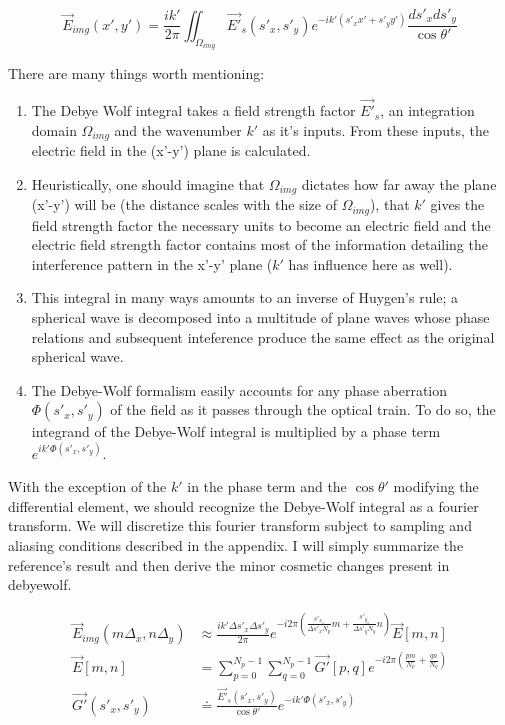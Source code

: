   \begin{equation*}
    \vec{E}_{img}(x', y') = \frac{i k'}{2 \pi} \iint_{\Omega_{img}} \vec{E'}_s(s'_x, s'_y) e^{-ik'(s'_xx'+s'_yy')}\frac{ds'_xds'_y}{\cos{\theta'}}
  \end{equation*}

  There are many things worth mentioning:
  \begin{enumerate}
  \item The Debye Wolf integral takes a field strength factor $\vec{E'}_s$,
    an integration domain $\Omega_{img}$ and the wavenumber $k'$ as it's inputs.
    From these inputs, the electric field in the (x'-y') plane is
    calculated. 
  \item Heuristically, one should imagine that $\Omega_{img}$ dictates how far 
    away the plane (x'-y') will be (the distance scales with the size of 
    $\Omega_{img}$), that $k'$ gives the field strength factor the necessary 
    units to become an electric field and the electric field strength factor 
    contains most of the information detailing the interference pattern in the
    x'-y' plane ($k'$ has influence here as well).
  \item This integral in many ways amounts to
  an inverse of Huygen's rule; a spherical wave is decomposed into a multitude 
  of plane waves whose phase relations and subsequent inteference produce
  the same effect as the original spherical wave.
  \item The Debye-Wolf formalism easily accounts for any phase aberration 
    $\Phi(s'_x,s'_y)$ of the field as it passes through the optical train. To do so, the integrand
    of the Debye-Wolf integral is multiplied by a phase term $e^{ik'\Phi(s'_x,s'_y)}$.
  \end{enumerate}

  With the exception of the $k'$ in the phase term and the $\cos{\theta'}$ 
  modifying the differential element, we should recognize the
  Debye-Wolf integral as a fourier transform. We will discretize this
  fourier transform subject to sampling and aliasing conditions described
  in the appendix. I will simply summarize the reference's result and then
  derive the minor cosmetic changes present in debyewolf.

  \begin{equation*}
    \begin{split}
      \vec{E}_{img}( m \Delta_x, n \Delta_y) & \approx \frac{i k' \Delta s'_x \Delta s'_y}{2 \pi} e^{-i2\pi \left ( \frac{s'_{x_o}}{\Delta s'_x N_p} m + \frac{s'_{y_o}}{\Delta s'_yN_q} n \right ) } \vec{E}\left [ m, n \right ] \\
      \vec{E}\left [ m,n \right ] & = \sum_{p=0}^{N_p-1}\sum_{q=0}^{N_p-1}\vec{G'}\left [p,q\right ] e^{-i2\pi \left ( \frac{pm}{N_p}+\frac{qn}{N_q} \right ) } \\
      \vec{G'}(s'_x,s'_y) & \doteq \frac{\vec{E'}_s(s'_x,s'_y)}{\cos{\theta'}}e^{-ik'\Phi(s'_x,s'_y)}
    \end{split}
  \end{equation*}
  
